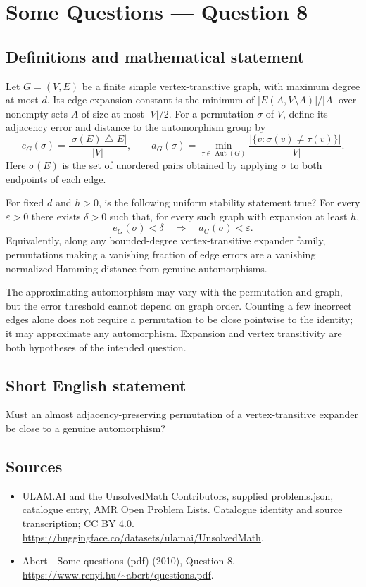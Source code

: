 \documentclass[11pt,a4paper]{article}
\begin{document}
\section*{Some Questions — Question 8}\label{statement}

\subsection{Definitions and mathematical statement}
Let $G=(V,E)$ be a finite simple vertex-transitive graph, with maximum degree at most $d$. Its edge-expansion constant is the minimum of $|E(A,V\setminus A)|/|A|$ over nonempty sets $A$ of size at most $|V|/2$. For a permutation $\sigma$ of $V$, define its adjacency error and distance to the automorphism group by
\[
 e_G(\sigma)=\frac{|\sigma(E)\mathbin{\triangle}E|}{|V|},\qquad
 a_G(\sigma)=\min_{\tau\in\operatorname{Aut}(G)}
            \frac{|\{v:\sigma(v)\ne\tau(v)\}|}{|V|}.
\]
Here $\sigma(E)$ is the set of unordered pairs obtained by applying $\sigma$ to both endpoints of each edge.

For fixed $d$ and $h>0$, is the following uniform stability statement true? For every $\varepsilon>0$ there exists $\delta>0$ such that, for every such graph with expansion at least $h$,
\[
 e_G(\sigma)<\delta\quad\Longrightarrow\quad a_G(\sigma)<\varepsilon.
\]
Equivalently, along any bounded-degree vertex-transitive expander family, permutations making a vanishing fraction of edge errors are a vanishing normalized Hamming distance from genuine automorphisms.

The approximating automorphism may vary with the permutation and graph, but the error threshold cannot depend on graph order. Counting a few incorrect edges alone does not require a permutation to be close pointwise to the identity; it may approximate any automorphism. Expansion and vertex transitivity are both hypotheses of the intended question.
\subsection{Short English statement}
Must an almost adjacency-preserving permutation of a vertex-transitive expander be close to a genuine automorphism?
\subsection{Sources}
\begin{itemize}
\item[S1] ULAM.AI and the UnsolvedMath Contributors, supplied problems.json, catalogue entry, AMR Open Problem Lists. Catalogue identity and source transcription; CC BY 4.0.
\url{https://huggingface.co/datasets/ulamai/UnsolvedMath}.
\item[S2] Abert - Some questions (pdf) (2010), Question 8. 
\url{https://www.renyi.hu/~abert/questions.pdf}.
\end{itemize}
\end{document}
